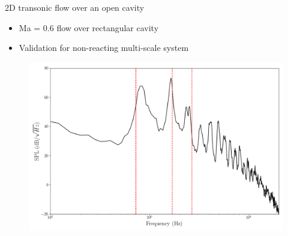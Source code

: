 \documentclass[]{beamer}
\begin{document}
\begin{frame}{2D transonic flow over an open cavity}
    \begin{itemize}
		\item Ma = 0.6 flow over rectangular cavity\footnotemark[12]
		\item Validation for non-reacting multi-scale system
	\end{itemize}
	\begin{figure}
		\begin{minipage}{0.59\linewidth}
		\end{minipage}
		\begin{minipage}{0.4\linewidth}
			\includegraphics[width=0.99\linewidth]{experiments/2d_cavity/psd_fom_100ms.png}
		\end{minipage}
	\end{figure}

\end{frame}
\end{document}
